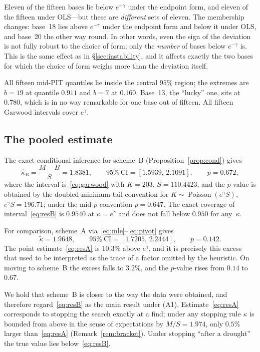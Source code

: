 \documentclass[11pt,a4paper]{article}
\theoremstyle{plain}
\theoremstyle{remark}
\newcommand{\eg}{e^{\gamma}}
\newcommand{\emg}{e^{-\gamma}}
\DeclareMathOperator{\Pois}{Poisson}
\begin{document}
Eleven of the fifteen bases lie below $\emg$ under the endpoint form, and eleven
of the fifteen under OLS---but these are \emph{different} sets of eleven. The
membership changes: base~18 lies above $\emg$ under the endpoint form and below
it under OLS, and base~20 the other way round. In other words, even the sign of
the deviation is not fully robust to the choice of form; only the \emph{number}
of bases below $\emg$ is.
This is the same effect as in \S\ref{sec:instability}, and it affects exactly the
two bases for which the choice of form weighs more than the deviation itself.

All fifteen mid-PIT quantiles lie inside the central $95\%$ region; the extremes
are $b=19$ at quantile $0.911$ and $b=7$ at $0.160$. Base~13, the ``lucky'' one,
sits at $0.780$, which is in no way remarkable for one base out of fifteen. All
fifteen Garwood intervals cover $\eg$.

\subsection{The pooled estimate}\label{sec:pooled}

The exact conditional inference for scheme~B (Proposition~\ref{prop:cond})
gives
\begin{equation}\label{eq:resB}
\hat\kappa_{\mathrm B}=\frac{M-B}{S}=1.8381,\qquad
95\%\ \text{CI}=[1.5939,\,2.1091],\qquad p=0.672,
\end{equation}
where the interval is~\eqref{eq:garwood} with $K=203$, $S=110.4423$, and the
$p$-value is obtained by the doubled-minimum-tail convention for
$K\sim\Pois(\eg S)$, $\eg S=196.71$; under the mid-$p$ convention $p=0.647$.
The exact coverage of interval~\eqref{eq:resB} is $0.9540$ at $\kappa=\eg$ and
does not fall below $0.950$ for any~$\kappa$.

For comparison, scheme~A via~\eqref{eq:mle}--\eqref{eq:pivot} gives
\begin{equation}\label{eq:resA}
\tilde\kappa=1.9648,\qquad 95\%\ \text{CI}=[1.7205,\,2.2444],\qquad p=0.142 .
\end{equation}
The point estimate~\eqref{eq:resA} is $10.3\%$ above $\eg$, and it is precisely
this excess that used to be interpreted as the trace of a factor omitted by the
heuristic. On moving to scheme~B the excess falls to $3.2\%$, and the $p$-value
rises from $0.14$ to $0.67$.

We hold that scheme~B is closer to the way the data were obtained, and therefore
regard~\eqref{eq:resB} as the main result under (A1). Estimate~\eqref{eq:resA}
corresponds to stopping the search exactly at a find; under any stopping rule
$\kappa$ is bounded from above in the sense of expectations by $M/S=1.974$, only
$0.5\%$ larger than~\eqref{eq:resA} (Remark~\ref{rem:bracket}). Under stopping
``after a drought'' the true value lies below~\eqref{eq:resB}.
\end{document}
